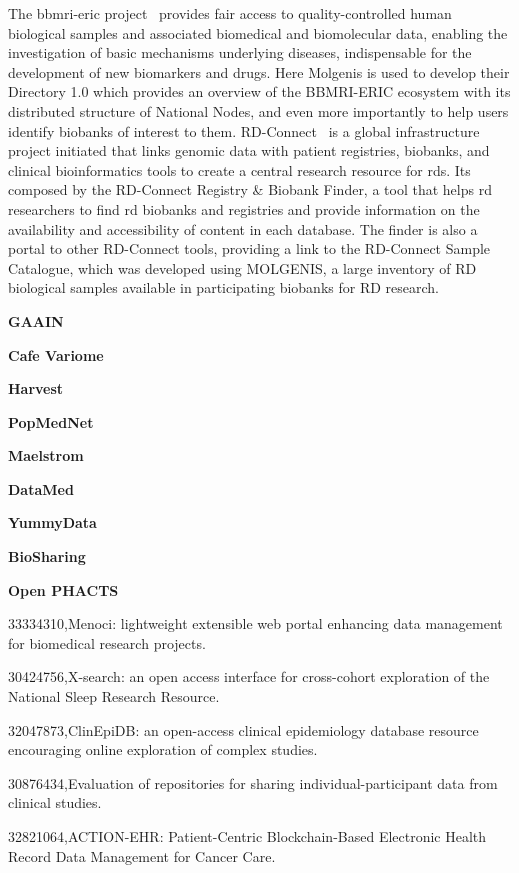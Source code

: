 The \gls{bbmri-eric} project~\cite{bbmrieric} provides fair access to quality-controlled human
biological samples and associated biomedical and biomolecular data, enabling the
investigation of basic mechanisms underlying diseases, indispensable for the
development of new biomarkers and drugs.
Here Molgenis is used to develop their Directory 1.0 which provides an overview of the
BBMRI-ERIC ecosystem with its distributed structure of National Nodes, and even more
importantly to help users identify biobanks of interest to them.
RD-Connect~\cite{rdconnect} is a global infrastructure project initiated that links
genomic data with patient registries, biobanks, and clinical bioinformatics tools to
create a central research resource for \gls{rd}s.
Its composed by the RD-Connect Registry \& Biobank Finder, a tool that helps \gls{rd}
researchers to find \gls{rd} biobanks and registries and provide information on the
availability and accessibility of content in each database.
The finder is also a portal to other RD-Connect tools, providing a link to the
RD-Connect Sample Catalogue, which was developed using MOLGENIS, a large inventory of
RD biological samples available in participating biobanks for RD research. 


\textbf{GAAIN}

\textbf{Cafe Variome \cite{cafevariome}}

\textbf{Harvest \cite{harvest}}

\textbf{PopMedNet \cite{popmednet}}

\textbf{Maelstrom \cite{maelstrom}}

\textbf{DataMed \cite{datamed}}

\textbf{YummyData \cite{yummydata}}

\textbf{BioSharing \cite{biosharing}}

\textbf{Open PHACTS \cite{phacts}}

33334310,Menoci: lightweight extensible web portal enhancing data management for biomedical research projects.

30424756,X-search: an open access interface for cross-cohort exploration of the National Sleep Research Resource.

32047873,ClinEpiDB: an open-access clinical epidemiology database resource encouraging online exploration of complex studies.

30876434,Evaluation of repositories for sharing individual-participant data from clinical studies.

32821064,ACTION-EHR: Patient-Centric Blockchain-Based Electronic Health Record Data Management for Cancer Care.

